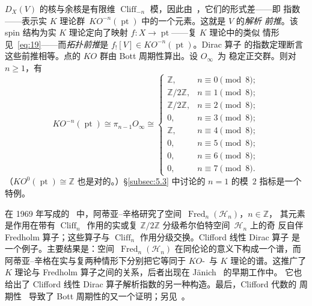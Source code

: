 \documentclass[11pt]{amsart}
\theoremstyle{definition}
\theoremstyle{remark}
\theoremstyle{plain}
\numberwithin{equation}{section}
\renewcommand{\:}{\colon}
\DeclareMathOperator{\pt}{pt}
\DeclareMathOperator{\Spin}{Spin}
\newcommand{\ZZ}{{\mathbb Z}}
\newcommand{\zmod}[1]{\ZZ/#1\ZZ}
\newcommand{\zt}{\zmod2}
\DeclareMathOperator{\Cliff}{Cliff}
\DeclareMathOperator{\Fred}{Fred}
\newcommand{\Cnm}{\Cliff_{-n}}
\newcommand{\Cn}{\Cliff_{n}}
\newcommand{\Fn}{\Fred_n}
\newcommand{\sH}{\mathscr{H}}
\begin{document}
$D_X(V)$ 的核与余核是有限维 $\Cnm$ 模，因此由~\cite{ABS}，它们的形式差——即
指数——表示实 $K$ 理论群~$KO^{-n}(\pt)$ 中的一个元素。这就是 $V$ 的\emph{解析
前推}。该 spin 结构为实 $K$ 理论定向了映射 $f\:X\to \pt$——复 $K$ 理论中的类似
情形见~\eqref{eq:19}——而\emph{拓扑前推}是 $f_![V]\in KO^{-n}(\pt)$。Dirac 算子
的指数定理断言这些前推相等。点的 $KO$ 群由 Bott 周期性算出。设 $O_\infty $~为
稳定正交群。则对~$n\ge1$，有
  \begin{equation}\label{eq:81}
     KO^{-n}(\pt)\cong \pi _{n-1}O_\infty \cong \begin{cases} \ZZ,&n\equiv
     0\pmod8;\\ \zt,&n\equiv 1\pmod8;\\ \zt,&n\equiv 2\pmod8;\\ 0,&n\equiv
     3\pmod8;\\ \ZZ,&n\equiv 4\pmod8;\\ 0,&n\equiv 5\pmod8;\\ 0,&n\equiv
     6\pmod8;\\ 0,&n\equiv7\pmod8.\end{cases} 
  \end{equation}
（$KO^0(\pt)\cong \ZZ$ 也是对的。）\S\ref{subsec:5.3} 中讨论的 $n=1$ 的模~$2$
指标是一个特例。

在 1969 年写成的~\cite{AS6} 中，阿蒂亚–辛格研究了空间~$\Fn(\sH_n)$，$n\in \ZZ$，
其元素是作用在带有 $\Cn$~作用的实或复 $\zt$ 分级希尔伯特空间~$\sH_n$ 上的奇
反自伴 Fredholm 算子；这些算子与 $\Cn$ 作用分级交换。Clifford 线性 Dirac 算子
是一个例子。主要结果是：空间~$\Fn(\sH_n)$ 在同伦论的意义下构成一个谱，而
阿蒂亚–辛格在实与复两种情形下分别把它等同于 $KO$-~与 $K$ 理论的谱。这推广了
$K$ 理论与 Fredholm 算子之间的关系，后者出现在 Jänich~\cite{J} 的早期工作中。
它也给出了 Clifford 线性 Dirac 算子解析指数的另一种构造。最后，Clifford 代数的
周期性~\cite{ABS} 导致了 Bott 周期性的又一个证明；另见~\cite{Kar,Wo}。
\end{document}
